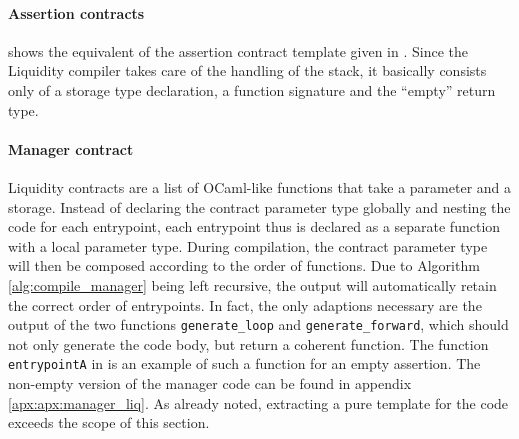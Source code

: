 \paragraph{Assertion contracts}
 shows the equivalent of the assertion contract template given in . Since the Liquidity compiler takes care of the handling of the stack, it basically consists only of a storage type declaration, a function signature and the ``empty'' return type.


\paragraph{Manager contract}
Liquidity contracts are a list of OCaml-like functions that take a parameter and a storage. Instead of declaring the contract parameter type globally and nesting the code for each entrypoint, each entrypoint thus is declared as a separate function with a local parameter type. During compilation, the contract parameter type will then be composed according to the order of functions. 
Due to Algorithm \ref{alg:compile_manager} being left recursive, the output will automatically retain the correct order of entrypoints. In fact, the only adaptions necessary are the output of the two functions \texttt{generate\_loop} and \texttt{generate\_forward}, which should not only generate the code body, but return a coherent function. The function \texttt{entrypointA} in  is an example of such a function for an empty assertion. The non-empty version of the manager code can be found in appendix \ref{apx:apx:manager_liq}. As already noted, extracting a pure template for the code exceeds the scope of this section.


